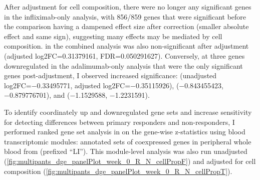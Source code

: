 \begin{outline}
After adjustment for cell composition, there were no longer any significant genes in the infliximab-only analysis, 
with 856/859 genes that were significant before the comparison having a dampened effect size after correction (smaller absolute effect and same sign), suggesting many effects may be mediated by cell composition.
 in the combined analysis was also non-significant after adjustment (adjusted log2FC=\num{0.31379161}, FDR=\num{0.050291627}).
Conversely, at three genes downregulated in the adalimumab-only analysis that were the only significant genes post-adjustment, I observed increased significance:
 (unadjusted log2FC=\num{-0.33495771}, adjusted log2FC=\num{-0.35115926}), 
 (\num{-0.843455423}, \num{-0.879776701}), 
and  (\num{-1.1529588}, \num{-1.2231591}).

To identify coordinately up and downregulated gene sets and increase sensitivity for detecting differences between primary responders and non-responders,
I performed ranked gene set analysis in on the gene-wise z-statistics using blood transcriptomic modules: annotated sets of coexpressed genes in peripheral whole blood from \textcite{li2013MolecularSignaturesAntibody} (prefixed \enquote{LI}).
This module-level analysis was also run unadjusted (\autoref{fig:multipants_dge_panelPlot_week_0_R_N_cellPropF}) and adjusted for cell composition (\autoref{fig:multipants_dge_panelPlot_week_0_R_N_cellPropT}).


\end{outline}
